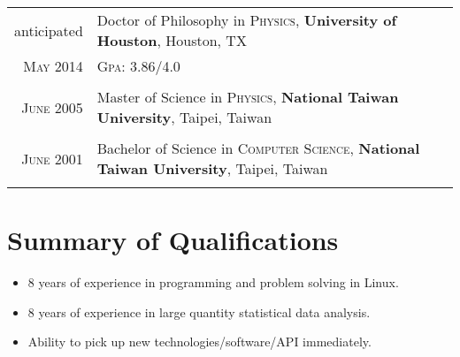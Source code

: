 \documentclass[11pt]{article} %
\begin{document}
\begin{tabular}{rl}
anticipated & Doctor of Philosophy in \textsc{Physics}, \textbf{University of Houston}, Houston, TX\\
\textsc{May} 2014 &\normalsize \textsc{Gpa}: 3.86/4.0 \\%
&\\


\textsc{June} 2005 & Master of Science in \textsc{Physics}, \textbf{National Taiwan University}, Taipei, Taiwan \\
&\\


\textsc{June} 2001 & Bachelor of Science in \textsc{Computer Science}, \textbf{National Taiwan University}, Taipei, Taiwan\\
&\\


\end{tabular}



\section{Summary of Qualifications}
\begin{itemize}
  \item 8 years of experience in programming and problem solving in Linux.
  \item 8 years of experience in large quantity statistical data analysis.
  \item Ability to pick up new technologies/software/API immediately.
\end{itemize}


\end{document}
